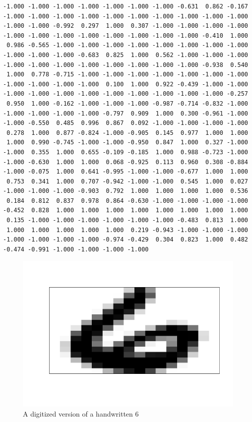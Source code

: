 \documentclass[
]{krantz}
\begin{document}
\begin{verbatim}
-1.000 -1.000 -1.000 -1.000 -1.000 -1.000 -1.000 -0.631  0.862 -0.167 
-1.000 -1.000 -1.000 -1.000 -1.000 -1.000 -1.000 -1.000 -1.000 -1.000 
-1.000 -1.000 -0.992  0.297  1.000  0.307 -1.000 -1.000 -1.000 -1.000 
-1.000 -1.000 -1.000 -1.000 -1.000 -1.000 -1.000 -1.000 -0.410  1.000 
 0.986 -0.565 -1.000 -1.000 -1.000 -1.000 -1.000 -1.000 -1.000 -1.000 
-1.000 -1.000 -1.000 -0.683  0.825  1.000  0.562 -1.000 -1.000 -1.000 
-1.000 -1.000 -1.000 -1.000 -1.000 -1.000 -1.000 -1.000 -0.938  0.540 
 1.000  0.778 -0.715 -1.000 -1.000 -1.000 -1.000 -1.000 -1.000 -1.000 
-1.000 -1.000 -1.000 -1.000  0.100  1.000  0.922 -0.439 -1.000 -1.000 
-1.000 -1.000 -1.000 -1.000 -1.000 -1.000 -1.000 -1.000 -1.000 -0.257 
 0.950  1.000 -0.162 -1.000 -1.000 -1.000 -0.987 -0.714 -0.832 -1.000 
-1.000 -1.000 -1.000 -1.000 -0.797  0.909  1.000  0.300 -0.961 -1.000 
-1.000 -0.550  0.485  0.996  0.867  0.092 -1.000 -1.000 -1.000 -1.000 
 0.278  1.000  0.877 -0.824 -1.000 -0.905  0.145  0.977  1.000  1.000 
 1.000  0.990 -0.745 -1.000 -1.000 -0.950  0.847  1.000  0.327 -1.000 
-1.000  0.355  1.000  0.655 -0.109 -0.185  1.000  0.988 -0.723 -1.000 
-1.000 -0.630  1.000  1.000  0.068 -0.925  0.113  0.960  0.308 -0.884 
-1.000 -0.075  1.000  0.641 -0.995 -1.000 -1.000 -0.677  1.000  1.000 
 0.753  0.341  1.000  0.707 -0.942 -1.000 -1.000  0.545  1.000  0.027 
-1.000 -1.000 -1.000 -0.903  0.792  1.000  1.000  1.000  1.000  0.536 
 0.184  0.812  0.837  0.978  0.864 -0.630 -1.000 -1.000 -1.000 -1.000 
-0.452  0.828  1.000  1.000  1.000  1.000  1.000  1.000  1.000  1.000 
 0.135 -1.000 -1.000 -1.000 -1.000 -1.000 -1.000 -0.483  0.813  1.000 
 1.000  1.000  1.000  1.000  1.000  0.219 -0.943 -1.000 -1.000 -1.000 
-1.000 -1.000 -1.000 -1.000 -0.974 -0.429  0.304  0.823  1.000  0.482 
-0.474 -0.991 -1.000 -1.000 -1.000 -1.000 
\end{verbatim}

\begin{figure}
\centering
\includegraphics{bookdown_files/figure-latex/digit-1.pdf}
\caption{\label{fig:digit}A digitized version of a handwritten 6}
\end{figure}
\end{document}
